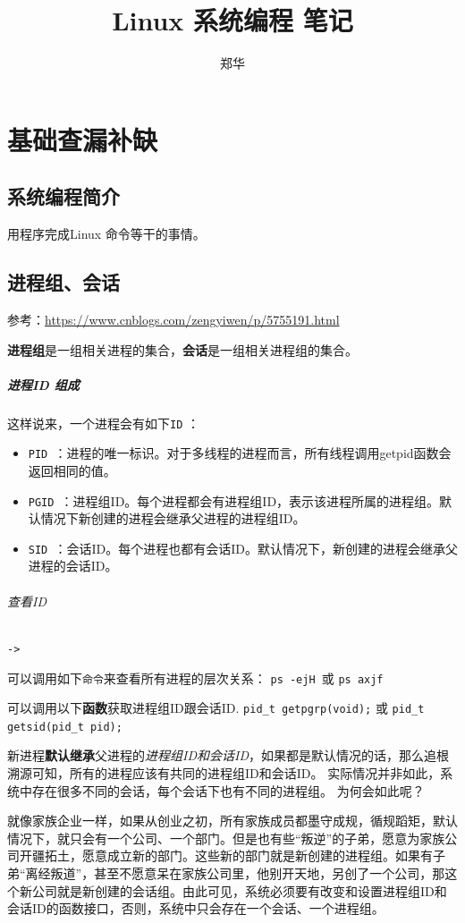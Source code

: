 \documentclass[UTF8,a4paper,12pt]{ctexbook}
\author{\kaishu 郑华}
\title{Linux 系统编程 笔记}
\begin{document}
 	\maketitle
 
\chapter{基础查漏补缺}
	\section{系统编程简介}
		用程序完成Linux 命令等干的事情。
	
	\section{进程组、会话}
		参考：\url{https://www.cnblogs.com/zengyiwen/p/5755191.html}
		
		\textbf{进程组}是一组相关进程的集合，\textbf{会话}是一组相关进程组的集合。
	
		
		\paragraph{进程ID 组成}这样说来，一个进程会有如下\verb|ID| ：
			\begin{itemize}
				\item \verb|PID |：进程的唯一标识。对于多线程的进程而言，所有线程调用getpid函数会返回相同的值。
				\item \verb|PGID |：进程组ID。每个进程都会有进程组ID，表示该进程所属的进程组。默认情况下新创建的进程会继承父进程的进程组ID。
				\item \verb|SID |：会话ID。每个进程也都有会话ID。默认情况下，新创建的进程会继承父进程的会话ID。
			\end{itemize}
		
			\subparagraph{查看ID}\verb|->|
			
			可以调用如下\verb|命令|来查看所有进程的层次关系：
			\verb|ps -ejH |或
			\verb|ps axjf |
			
			可以调用以下\textbf{函数}获取进程组ID跟会话ID.
			\verb|pid_t getpgrp(void);| 或
			\verb|pid_t getsid(pid_t pid); |
			
		
			新进程\textbf{默认继承}父进程的\textit{进程组ID和会话ID}，如果都是默认情况的话，那么追根溯源可知，所有的进程应该有共同的进程组ID和会话ID。
			实际情况并非如此，系统中存在很多不同的会话，每个会话下也有不同的进程组。
			为何会如此呢？
			
			就像家族企业一样，如果从创业之初，所有家族成员都墨守成规，循规蹈矩，默认情况下，就只会有一个公司、一个部门。但是也有些“叛逆”的子弟，愿意为家族公司开疆拓土，愿意成立新的部门。这些新的部门就是新创建的进程组。如果有子弟“离经叛道”，甚至不愿意呆在家族公司里，他别开天地，另创了一个公司，那这个新公司就是新创建的会话组。由此可见，系统必须要有改变和设置进程组ID和会话ID的函数接口，否则，系统中只会存在一个会话、一个进程组。
		
\end{document}
